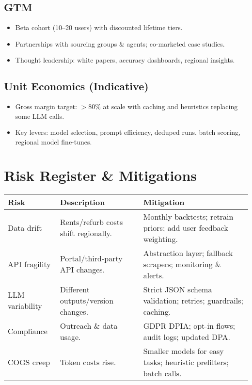 \documentclass[12pt,a4paper]{article}
\begin{document}
\subsection{GTM}
\begin{itemize}[leftmargin=1.5em]
  \item Beta cohort (10–20 users) with discounted lifetime tiers.
  \item Partnerships with sourcing groups \& agents; co-marketed case studies.
  \item Thought leadership: white papers, accuracy dashboards, regional insights.
\end{itemize}

\subsection{Unit Economics (Indicative)}
\begin{itemize}[leftmargin=1.5em]
  \item Gross margin target: $>$80\% at scale with caching and heuristics replacing some LLM calls.
  \item Key levers: model selection, prompt efficiency, deduped runs, batch scoring, regional model fine-tunes.
\end{itemize}

\section{Risk Register \& Mitigations}
\begin{longtable}{@{}p{3cm}p{7.5cm}p{4.5cm}@{}}
\toprule
\textbf{Risk} & \textbf{Description} & \textbf{Mitigation} \\
\midrule
Data drift & Rents/refurb costs shift regionally. & Monthly backtests; retrain priors; add user feedback weighting. \\
API fragility & Portal/third-party API changes. & Abstraction layer; fallback scrapers; monitoring \& alerts. \\
LLM variability & Different outputs/version changes. & Strict JSON schema validation; retries; guardrails; caching. \\
Compliance & Outreach \& data usage. & GDPR DPIA; opt-in flows; audit logs; updated DPA. \\
COGS creep & Token costs rise. & Smaller models for easy tasks; heuristic prefilters; batch calls. \\
\bottomrule
\end{longtable}
\end{document}
